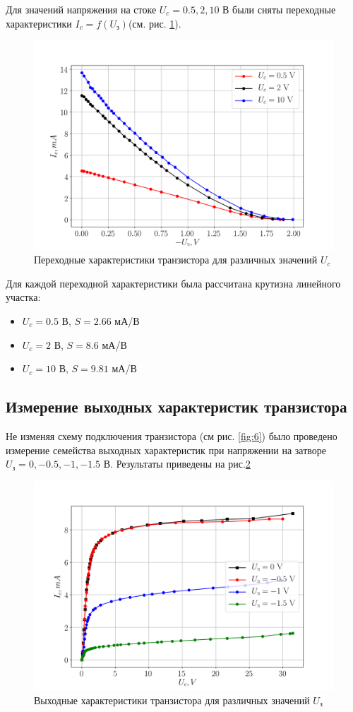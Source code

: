 Для значений напряжения на стоке $U_c = 0.5,2,10$ В были сняты переходные характеристики $I_c = f(U_{\text{з}})$(см.
рис. \ref{fig:7}). 
\begin{figure}[h!]
	\centering
	\includegraphics[width=0.75\linewidth]{fig/task1.png}
	\caption{Переходные характеристики транзистора для различных значений $U_c$}
	\label{fig:7}
\end{figure}

Для каждой переходной характеристики была рассчитана крутизна линейного участка:
\begin{itemize}
	\item $U_c=0.5$ В, $S = 2.66$ мА/В
	\item $U_c=2$ В, $S = 8.6$ мА/В
	\item $U_c=10$ В, $S = 9.81$ мА/В
\end{itemize} 

\subsection{Измерение выходных характеристик транзистора}
Не изменяя схему подключения транзистора (см рис. \ref{fig:6}) было проведено измерение семейства выходных характеристик
при напряжении на затворе $U_{\text{з}} = 0,-0.5,-1,-1.5$ В. Результаты приведены на рис.\ref{fig:8}
\begin{figure}[h!]
	\centering
	\includegraphics[width=0.75\linewidth]{fig/task2.png}
	\caption{Выходные характеристики транзистора для различных значений $U_{\text{з}}$}
	\label{fig:8}
\end{figure}

